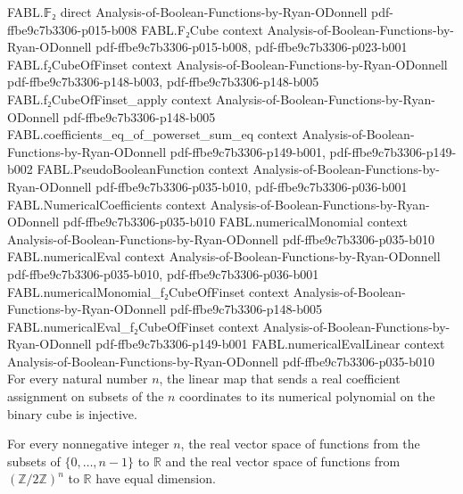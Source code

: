 \begin{theorem}
\label{FABL.numericalEval_injective}
\leanok
{}
\proofstep
  {FABL.𝔽₂}
  {direct}
  {Analysis-of-Boolean-Functions-by-Ryan-ODonnell}
  {pdf-ffbe9c7b3306-p015-b008}
\proofstep
  {FABL.F₂Cube}
  {context}
  {Analysis-of-Boolean-Functions-by-Ryan-ODonnell}
  {pdf-ffbe9c7b3306-p015-b008,
    pdf-ffbe9c7b3306-p023-b001}
\proofstep
  {FABL.f₂CubeOfFinset}
  {context}
  {Analysis-of-Boolean-Functions-by-Ryan-ODonnell}
  {pdf-ffbe9c7b3306-p148-b003,
    pdf-ffbe9c7b3306-p148-b005}
\proofstep
  {FABL.f₂CubeOfFinset_apply}
  {context}
  {Analysis-of-Boolean-Functions-by-Ryan-ODonnell}
  {pdf-ffbe9c7b3306-p148-b005}
\proofstep
  {FABL.coefficients_eq_of_powerset_sum_eq}
  {context}
  {Analysis-of-Boolean-Functions-by-Ryan-ODonnell}
  {pdf-ffbe9c7b3306-p149-b001,
    pdf-ffbe9c7b3306-p149-b002}
\proofstep
  {FABL.PseudoBooleanFunction}
  {context}
  {Analysis-of-Boolean-Functions-by-Ryan-ODonnell}
  {pdf-ffbe9c7b3306-p035-b010,
    pdf-ffbe9c7b3306-p036-b001}
\proofstep
  {FABL.NumericalCoefficients}
  {context}
  {Analysis-of-Boolean-Functions-by-Ryan-ODonnell}
  {pdf-ffbe9c7b3306-p035-b010}
\proofstep
  {FABL.numericalMonomial}
  {context}
  {Analysis-of-Boolean-Functions-by-Ryan-ODonnell}
  {pdf-ffbe9c7b3306-p035-b010}
\proofstep
  {FABL.numericalEval}
  {context}
  {Analysis-of-Boolean-Functions-by-Ryan-ODonnell}
  {pdf-ffbe9c7b3306-p035-b010,
    pdf-ffbe9c7b3306-p036-b001}
\proofstep
  {FABL.numericalMonomial_f₂CubeOfFinset}
  {context}
  {Analysis-of-Boolean-Functions-by-Ryan-ODonnell}
  {pdf-ffbe9c7b3306-p148-b005}
\proofstep
  {FABL.numericalEval_f₂CubeOfFinset}
  {context}
  {Analysis-of-Boolean-Functions-by-Ryan-ODonnell}
  {pdf-ffbe9c7b3306-p149-b001}
\proofstep
  {FABL.numericalEvalLinear}
  {context}
  {Analysis-of-Boolean-Functions-by-Ryan-ODonnell}
  {pdf-ffbe9c7b3306-p035-b010}
For every natural number $n$, the linear map that sends a real coefficient assignment on
subsets of the $n$ coordinates to its numerical polynomial on the binary cube is
injective.
\end{theorem}

\begin{theorem}
\label{FABL.finrank_numericalCoefficients_eq_pseudoBooleanFunction}
\leanok
{}
For every nonnegative integer $n$, the real vector space of functions from the subsets
of $\{0,\ldots,n-1\}$ to $\mathbb R$ and the real vector space of functions from
$(\mathbb Z/2\mathbb Z)^n$ to $\mathbb R$ have equal dimension.
\end{theorem}

